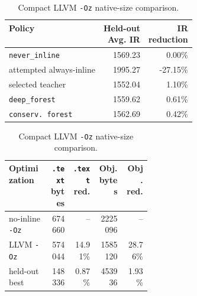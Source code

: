 \documentclass[12pt, a4paper]{report}
\begin{document}
\begin{table}[H]
\centering
\begin{minipage}[t]{0.54\textwidth}
\centering
{\small
\renewcommand{\arraystretch}{1.08}
\setlength{\tabcolsep}{3pt}
\begin{tabular}{|l|r|r|}
\hline
Policy & \shortstack{Held-out\\Avg. IR} & \shortstack{IR\\reduction} \\
\hline
\texttt{never\_inline} & 1569.23 & 0.00\% \\
\hline
attempted always-inline & 1995.27 & -27.15\% \\
\hline
selected teacher & 1552.04 & 1.10\% \\
\hline
\texttt{deep\_forest} & 1559.62 & 0.61\% \\
\hline
\texttt{conserv.\ forest} & 1562.69 & 0.42\% \\
\hline
\end{tabular}
}
\caption{Held-out reference comparison.}
\label{tab:held-out-reference}
\end{minipage}\hfill
\begin{minipage}[t]{0.42\textwidth}
\centering
{\footnotesize
\setlength{\tabcolsep}{1pt}
\begin{tabular}{|p{0.28\linewidth}|r|r|r|r|}
\hline
Optimization & \shortstack{\texttt{.text}\\bytes} &
\shortstack{\texttt{.text}\\red.} &
\shortstack{Obj.\\bytes} &
\shortstack{Obj.\\red.} \\
\hline
no-inline \texttt{-Oz} & 674660 & -- & 2225096 & -- \\
\hline
LLVM \texttt{-Oz} & 574044 & 14.91\% & 1585120 & 28.76\% \\
\hline
held-out best & 148336 & 0.87\% & 453936 & 1.93\% \\
\hline
\end{tabular}
\renewcommand{\arraystretch}{1}
}
\caption{Compact LLVM \texttt{-Oz} native-size comparison.}
\label{tab:llvm-oz-comparison}
\end{minipage}
\end{table}
\end{document}
